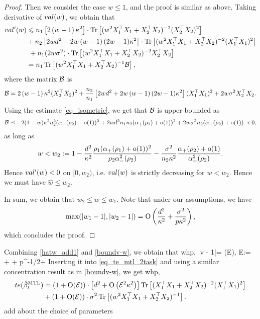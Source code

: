 \begin{proof}
Then we consider the case $w\le 1$, and the proof is similar as above. Taking derivative of $\val(w)$, we obtain that
\begin{align}
	\val'(w) &\le n_1 \left[2\left( w-1\right) \kappa^2\right]\cdot \tr\left[( w^2X_1^{\top}X_1 +X_2^{\top}X_2)^{-2} (X_2^{\top}X_2)^2\right] \nonumber \\
	& + n_2\left[2wd^2 +2w\left( w-1\right)(2w-1)\kappa^2\right]\cdot \tr\left[( w^2X_1^{\top}X_1 +X_2^{\top}X_2)^{-2} (X_1^{\top}X_1)^2\right] \nonumber\\
	&~ + n_1(2 w\sigma^2) \cdot \bigtr{(w^2X_1^{\top}X_1 + X_2^{\top}X_2)^{-2} X_2^\top X_2  }\\
			& = n_1 \bigtr{(w^2X_1^{\top}X_1  + X_2^{\top}X_2)^{-1} \cal B} , \nonumber
\end{align}
where the matrix $\cal B$ is
$$\cal B= 2\left( w-1\right) \kappa^2  (X_2^{\top}X_2)^2+\frac{n_2}{n_1}\left[2wd^2 +2w\left( w-1\right)(2w-1)\kappa^2\right](X_1^{\top}X_1)^2 + 2 w\sigma^2 X_2^\top X_2 .$$
Using the estimate \eqref{eq_isometric}, we get that $\cal B$ is upper bounded as
\begin{align*}
\cal B \preceq - 2(1-w)\kappa^2 n_2^2 (\al_-(\rho_2) -\oo(1))^2 +2w d^2 n_1n_2 (\al_+(\rho_1) +\oo(1))^2 + 2w\sigma^2 n_2 (\al_+(\rho_2)+\oo(1)) \prec 0,
\end{align*}
as long as
$$w< w_2:=1 -   \frac{d^2}{\kappa^2}\frac{\rho_1(\al_+(\rho_1) +\oo(1))^2}{\rho_2 \al_-^2(\rho_2) } -  \frac{\sigma^2}{n_2\kappa^2}\frac{\al_{+}(\rho_2)+\oo(1)}{\al_{-}^2(\rho_2)} .$$
Hence $\val'(w)<0$ on $[0,w_2)$, i.e. $\val(w)$ is strictly decreasing for $w<w_2$. Hence we must have $\hat w\le w_2$. 

In sum, we obtain that $w_2\le w\le w_1$. Note that under our assumptions, we have 
$$\max(|w_1 -1|, |w_2 -1|) =\OO\left(\frac{d^2}{\kappa^2} + \frac{\sigma^2}{p\kappa^2}\right),$$
which concludes the proof.
\end{proof}

Combining \eqref{hatw_add1} and \eqref{boundv-w}, we obtain that whp,
\be\label{hatv_add1} 
|\hat v - 1|= \OO\left(\cal E\right), \quad \cal E:= +  + p^{-1/2+\e} 
\ee
Inserting it into \eqref{eq_te_mtl_2task} and using a similar concentration result as in \eqref{boundv-w}, we get whp,
\begin{align}
\te(\hat{\beta}_t^{\MTL})&=(1+\OO(\cal E))\cdot \left[d^2 + \OO\left(\cal E^2 \kappa^2\right)\right] \tr\left[(X_1^{\top}X_1 +X_2^{\top}X_2)^{-2} (X_1^{\top}X_1)^2\right]\nonumber\\ 
&+(1+\OO(\cal E))\cdot \sigma^2  \bigtr{(w^2X_1^{\top}X_1  + X_2^{\top}X_2)^{-1} }. \nonumber
\end{align}
{\cor add about the choice of parameters}

